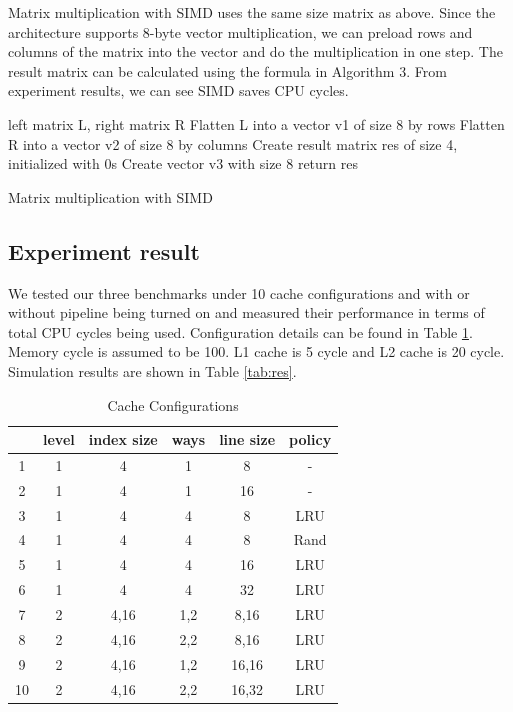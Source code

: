 \documentclass{sig-alternate}
\begin{document}
Matrix multiplication with SIMD uses the same size matrix as above. Since the architecture supports 8-byte vector multiplication, we can preload rows and columns of the matrix into the vector and do the multiplication in one step. The result matrix can be calculated using the formula in Algorithm 3. From experiment results, we can see SIMD saves CPU cycles. 

\begin{algorithm}[h]
\SetAlgoLined
 left matrix L, right matrix R\;
 Flatten L into a vector v1 of size 8 by rows\;
 Flatten R into a vector v2 of size 8 by columns\;
 Create result matrix res of size 4, initialized with 0s\; 
 Create vector v3 with size 8\;
 return res\;
 \caption{Matrix multiplication with SIMD}
\end{algorithm}

\subsection{Experiment result}
We tested our three benchmarks under 10 cache configurations and with or without pipeline being turned on and measured their performance in terms of total CPU cycles being used. Configuration details can be found in Table \ref{tab:conf}. Memory cycle is assumed to be 100. L1 cache is 5 cycle and L2 cache is 20 cycle. Simulation results are shown in Table \ref{tab:res}. 
\begin{table}[!ht]
\caption{Cache Configurations}
\label{tab:conf}
\centering
\begin{tabular}{|c|c|c|c|c|c|}
\hline
 & level & index size & ways & line size & policy \\ \hline
 1 & 1& 4 & 1& 8& -\\
\hline
 2 & 1& 4 & 1& 16 & -\\
\hline
 3 & 1& 4 & 4& 8& LRU\\
\hline
 4 & 1& 4 & 4& 8& Rand\\
\hline
 5 & 1& 4 & 4& 16& LRU\\
\hline
 6 & 1& 4 & 4& 32& LRU\\
\hline
 7 & 2 & 4,16 & 1,2& 8,16& LRU\\
\hline
 8 & 2 & 4,16 & 2,2& 8,16& LRU\\
\hline
 9 & 2 & 4,16 & 1,2& 16,16& LRU\\
\hline
 10 & 2 & 4,16 & 2,2& 16,32& LRU\\
\hline
\end{tabular}
\end{table}
\end{document}
